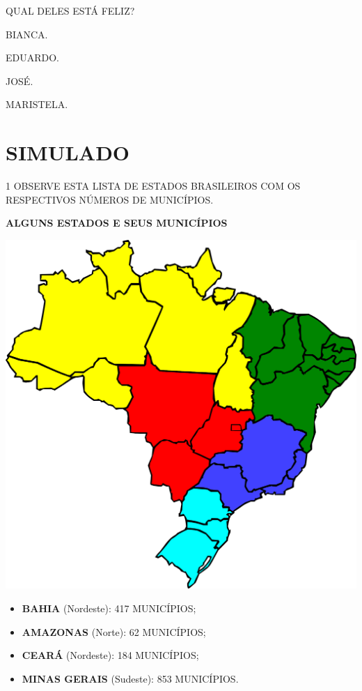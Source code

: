 QUAL DELES ESTÁ FELIZ?

\begin{multicols}{2}
\begin{escolha}%
\item BIANCA.

\item EDUARDO.

\item JOSÉ.

\item MARISTELA.
\end{escolha}
\end{multicols}

\pagebreak



\chapter[SIMULADO 3]{SIMULADO}

\num{1} OBSERVE ESTA LISTA DE ESTADOS BRASILEIROS COM OS RESPECTIVOS NÚMEROS DE MUNICÍPIOS.

\begin{myquote}
\textbf{ALGUNS ESTADOS E SEUS MUNICÍPIOS}

\begin{center}
\includegraphics[width=.8\textwidth]{media/image120.png}
\end{center}

\begin{itemize}
  \item \textbf{BAHIA} (Nordeste): 417 MUNICÍPIOS;
  \item \textbf{AMAZONAS} (Norte): 62 MUNICÍPIOS;
  \item \textbf{CEARÁ} (Nordeste): 184 MUNICÍPIOS;
  \item \textbf{MINAS GERAIS} (Sudeste): 853 MUNICÍPIOS.
\end{itemize}
\end{myquote}

